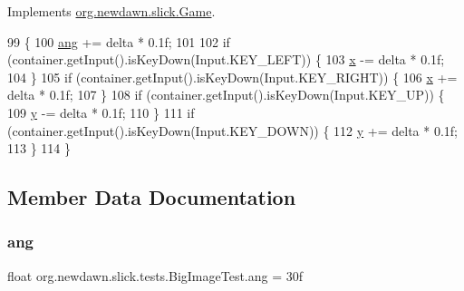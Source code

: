 Implements \mbox{\hyperlink{interfaceorg_1_1newdawn_1_1slick_1_1_game_ab07b2e9463ee4631620dde0de25bdee8}{org.\+newdawn.\+slick.\+Game}}.


\begin{DoxyCode}
99                                                                                  \{
100         \mbox{\hyperlink{classorg_1_1newdawn_1_1slick_1_1tests_1_1_big_image_test_a594a1221b0db224feb5cca1aa62a81a7}{ang}} += delta * 0.1f;
101         
102         \textcolor{keywordflow}{if} (container.getInput().isKeyDown(Input.KEY\_LEFT)) \{
103             \mbox{\hyperlink{classorg_1_1newdawn_1_1slick_1_1tests_1_1_big_image_test_a6f555917c3173ff62aac2bde25393e95}{x}} -= delta * 0.1f;
104         \}
105         \textcolor{keywordflow}{if} (container.getInput().isKeyDown(Input.KEY\_RIGHT)) \{
106             \mbox{\hyperlink{classorg_1_1newdawn_1_1slick_1_1tests_1_1_big_image_test_a6f555917c3173ff62aac2bde25393e95}{x}} += delta * 0.1f;
107         \}
108         \textcolor{keywordflow}{if} (container.getInput().isKeyDown(Input.KEY\_UP)) \{
109             \mbox{\hyperlink{classorg_1_1newdawn_1_1slick_1_1tests_1_1_big_image_test_a423ca36ec29a719e670e143236347c77}{y}} -= delta * 0.1f;
110         \}
111         \textcolor{keywordflow}{if} (container.getInput().isKeyDown(Input.KEY\_DOWN)) \{
112             \mbox{\hyperlink{classorg_1_1newdawn_1_1slick_1_1tests_1_1_big_image_test_a423ca36ec29a719e670e143236347c77}{y}} += delta * 0.1f;
113         \}
114     \}
\end{DoxyCode}


\subsection{Member Data Documentation}
\mbox{\label{classorg_1_1newdawn_1_1slick_1_1tests_1_1_big_image_test_a594a1221b0db224feb5cca1aa62a81a7}} 
\subsubsection{\texorpdfstring{ang}{ang}}
{\footnotesize\ttfamily float org.\+newdawn.\+slick.\+tests.\+Big\+Image\+Test.\+ang = 30f\hspace{0.3cm}{\ttfamily [private]}}

